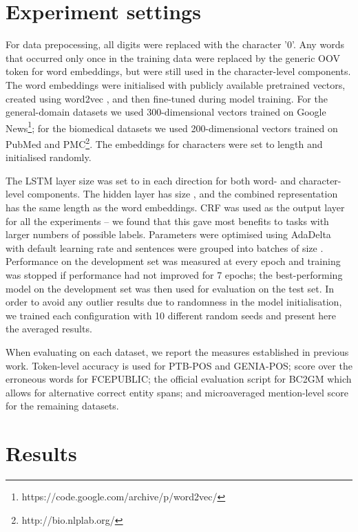 \documentclass[11pt]{article}
\begin{document}
\section{Experiment settings}
\label{sec:evaluation}

For data prepocessing, all digits were replaced with the character '0'. Any words that occurred only once in the training data were replaced by the generic OOV token for word embeddings, but were still used in the character-level components. 
The word embeddings were initialised with publicly available pretrained vectors, created using word2vec \cite{Mikolov2013a}, and then fine-tuned during model training. For the general-domain datasets we used 300-dimensional vectors trained on Google News\footnote{https://code.google.com/archive/p/word2vec/}; for the biomedical datasets we used 200-dimensional vectors trained on PubMed and PMC\footnote{http://bio.nlplab.org/}. The embeddings for characters were set to length  and initialised randomly.

The LSTM layer size was set to  in each direction for both word- and character-level components.
The hidden layer  has size , and the combined representation  has the same length as the word embeddings.
CRF was used as the output layer for all the experiments -- we found that this gave most benefits to tasks with larger numbers of possible labels.
Parameters were optimised using AdaDelta \cite{Zeiler2012} with default learning rate  and sentences were grouped into batches of size . 
Performance on the development set was measured at every epoch and training was stopped if performance had not improved for 7 epochs; the best-performing model on the development set was then used for evaluation on the test set.
In order to avoid any outlier results due to randomness in the model initialisation, we trained each configuration with 10 different random seeds and present here the averaged results.

When evaluating on each dataset, we report the measures established in previous work.
Token-level accuracy is used for PTB-POS and GENIA-POS;  score over the erroneous words for FCEPUBLIC; the official evaluation script for BC2GM which allows for alternative correct entity spans; and microaveraged mention-level  score for the remaining datasets.

\section{Results}
\label{sec:results}
\end{document}
